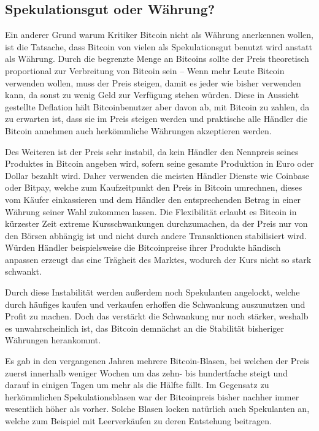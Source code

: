 \subsection{Spekulationsgut oder Währung?}
\label{sec:speculation}

Ein anderer Grund warum Kritiker Bitcoin nicht als Währung anerkennen wollen, ist die Tatsache, dass Bitcoin von vielen als Spekulationsgut benutzt wird anstatt als Währung.
Durch die begrenzte Menge an Bitcoins sollte der Preis theoretisch proportional zur Verbreitung von Bitcoin sein -- Wenn mehr Leute Bitcoin verwenden wollen, muss der Preis steigen, damit es jeder wie bisher verwenden kann, da sonst zu wenig Geld zur Verfügung stehen würden.
Diese in Aussicht gestellte Deflation hält Bitcoinbenutzer aber davon ab, mit Bitcoin zu zahlen, da zu erwarten ist, dass sie im Preis steigen werden und praktische alle Händler die Bitcoin annehmen auch herkömmliche Währungen akzeptieren werden.

Des Weiteren ist der Preis sehr instabil, da kein Händler den Nennpreis seines Produktes in Bitcoin angeben wird, sofern seine gesamte Produktion in Euro oder Dollar bezahlt wird.
Daher verwenden die meisten Händler Dienste wie Coinbase oder Bitpay, welche zum Kaufzeitpunkt den Preis in Bitcoin umrechnen, dieses vom Käufer einkassieren und dem Händler den entsprechenden Betrag in einer Währung seiner Wahl zukommen lassen.
Die Flexibilität erlaubt es Bitcoin in kürzester Zeit extreme Kursschwankungen durchzumachen, da der Preis nur von den Börsen abhängig ist und nicht durch andere Transaktionen stabilisiert wird.
Würden Händler beispielsweise die Bitcoinpreise ihrer Produkte händisch anpassen erzeugt das eine Trägheit des Marktes, wodurch der Kurs nicht so stark schwankt.

Durch diese Instabilität werden außerdem noch Spekulanten angelockt, welche durch häufiges kaufen und verkaufen erhoffen die Schwankung auszunutzen und Profit zu machen.
Doch das verstärkt die Schwankung nur noch stärker, weshalb es unwahrscheinlich ist, das Bitcoin demnächst an die Stabilität bisheriger Währungen herankommt.

Es gab in den vergangenen Jahren mehrere Bitcoin-Blasen, bei welchen der Preis zuerst innerhalb weniger Wochen um das zehn- bis hundertfache steigt und darauf in einigen Tagen um mehr als die Hälfte fällt.
Im Gegensatz zu herkömmlichen Spekulationsblasen war der Bitcoinpreis bisher nachher immer wesentlich höher als vorher.
Solche Blasen locken natürlich auch Spekulanten an, welche zum Beispiel mit Leerverkäufen zu deren Entstehung beitragen.

